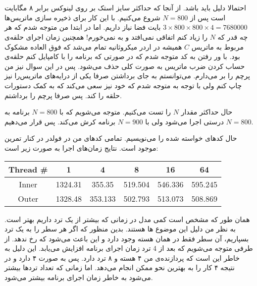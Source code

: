 \section{}
احتمالا دلیل
باید
باشد. از آنجا که حداکثر سایز استک بر روی لینوکس برابر ۸ مگابایت است پس از
$N = 800$
شروع می‌کنیم. با این کار برای ذخیره سازی ماتریس‌ها
$3 \times 800 \times 800 \times 4 = 7680000$
بایت فضا نیاز داریم. اما در ابتدا من متوجه شدم که هر چه قدر که
$N$
را زیاد کنم اتفاقی نمی‌افتد و به
نمی‌خورم! همچنین زمان اجرای حلقه‌ی مربوط به ماتریس
$C$
همیشه در اردر میکروثانیه تمام می‌شد که فوق العاده مشکوک بود. با ور رفتن به کد متوجه شدم که در صورتی که
برنامه را با
کامپایل کنم حلقه‌ی حساب کردن ضرب ماتریس به صورت کلی حذف می‌شود. پس در این سوال نیز من پرچم
را بر می‌دارم. می‌توانستم به جای برداشتن
صرفا یکی از درایه‌های ماتریس‌را نیز چاپ کنم ولی با توجه به
متوجه شدم که خود
نیز سعی می‌کند که به کمک دستورات
حلقه را
کند. پس صرفا پرچم
را برداشتم.

حال حداکثر مقدار
$N$
را تست می‌کنیم. متوجه می‌شویم که با
$N = 800$
برنامه به درستی اجرا می‌شود ولی با
$N = 900$
برنامه کرش می‌کند. پس قرار می‌دهیم
$N = 800$.

حال کد‌های خواسته شده را می‌نویسیم. تمامی کد‌های من در فولدر
در کنار تمرین موجود است. نتایج زمان‌های اجرا به صورت زیر است:
\begin{latin}
\centering
\begin{tabular}{|c|c|c|c|c|c|}
    \hline
    Thread \# & 1 & 4 & 8 & 16 & 64\\
    \hline
    Inner & 1324.31 & 355.35 & 519.504 & 546.336 & 595.245 \\
    \hline
    Outer & 1328.48 & 353.133 & 502.793 & 513.073 & 508.869 \\
    \hline
\end{tabular}
\end{latin}
همان طور که مشخص است کمی مدل
در زمانی که بیشتر از یک ترد‌ داریم بهتر است. به نظر من دلیل این موضوع
ها
هستند. بدین منظور که اگر هر سطر را به یک ترد بسپاریم، آن سطر فقط در همان هسته وجود دارد و این باعث
می‌شود که
رخ ندهد. از طرفی متوجه می‌شویم که بعد از 4 ترد زمان اجرای برنامه افزایش می‌یابد. این دلیل
به خاطر این است که پردازنده‌ی من ۴ هسته و ۸ ترد دارد. پس به صورت
۴ 
دارد و در نتیجه ۴ کار را به بهترین نحو ممکن انجام می‌دهد. اما زمانی که تعداد ترد‌ها بیشتر می‌شود به خاطر
زمان اجرای برنامه بیشتر می‌شود.